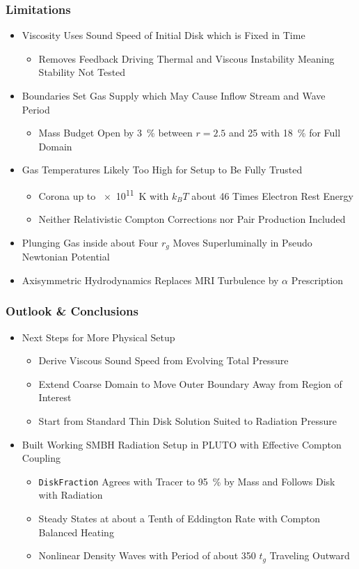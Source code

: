 	\begin{frame}
		\frametitle{Limitations}
		\begin{itemize}
			\item<2-> Viscosity Uses Sound Speed of Initial Disk which is Fixed in Time
			\begin{itemize}
				\item<3-> Removes Feedback Driving Thermal and Viscous Instability Meaning Stability Not Tested
			\end{itemize}
			\item<4-> Boundaries Set Gas Supply which May Cause Inflow Stream and Wave Period
			\begin{itemize}
				\item<5-> Mass Budget Open by \qty{3}{\percent} between $r = 2.5$ and \num{25} with \qty{18}{\percent} for Full Domain
			\end{itemize}
			\item<6-> Gas Temperatures Likely Too High for Setup to Be Fully Trusted
			\begin{itemize}
				\item<7-> Corona up to \qty{e11}{\kelvin} with $k_B T$ about \num{46} Times Electron Rest Energy
				\item<8-> Neither Relativistic Compton Corrections nor Pair Production Included
			\end{itemize}
			\item<9-> Plunging Gas inside about Four $r_g$ Moves Superluminally in Pseudo Newtonian Potential
			\item<10-> Axisymmetric Hydrodynamics Replaces MRI Turbulence by $\alpha$ Prescription
		\end{itemize}
	\end{frame}

	\begin{frame}
		\frametitle{Outlook \& Conclusions}
		\begin{itemize}
			\item<2-> Next Steps for More Physical Setup
			\begin{itemize}
				\item<3-> Derive Viscous Sound Speed from Evolving Total Pressure
				\item<4-> Extend Coarse Domain to Move Outer Boundary Away from Region of Interest
				\item<5-> Start from Standard Thin Disk Solution Suited to Radiation Pressure
			\end{itemize}
			\item<6-> Built Working SMBH Radiation Setup in PLUTO with Effective Compton Coupling
			\begin{itemize}
				\item<7-> \texttt{DiskFraction} Agrees with Tracer to \qty{95}{\percent} by Mass and Follows Disk with Radiation
				\item<8-> Steady States at about a Tenth of Eddington Rate with Compton Balanced Heating
				\item<9-> Nonlinear Density Waves with Period of about \num{350} $t_g$ Traveling Outward
			\end{itemize}
		\end{itemize}
	\end{frame}

